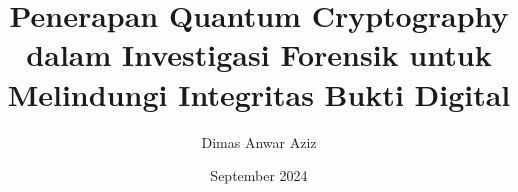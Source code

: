 \documentclass[a4paper,12pt]{report}
\begin{document}
\title{Penerapan Quantum Cryptography dalam Investigasi Forensik untuk Melindungi Integritas Bukti Digital}
\author{Dimas Anwar Aziz}
\date{September 2024}

\maketitle  %


\tableofcontents
\newpage

\listoffigures  %
\listoftables   %
\newpage


\newpage
\printbibliography  %
\end{document}
